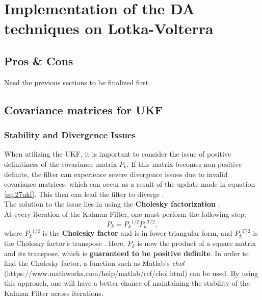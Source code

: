 \documentclass[review]{elsarticle}
\begin{document}

\section{Implementation of the DA techniques on Lotka-Volterra}\label{Lotka-Volterra}



\subsection{Pros \& Cons}
Need the previous sections to be finalized first.


\subsection{Covariance matrices for UKF}

    \subsubsection{Stability and Divergence Issues}
    When utilizing the UKF, it is important to consider the issue of positive definitiness of the covariance matrix $P_k$. If this matrix becomes non-positive definite, the filter can experience severe divergence issues due to invalid covariance matrices, which can occur as a result of the update made in equation \ref{eq:27ukf}. This then can lead the filter to diverge \cite{SimonHaykinText}. \\
    
    The solution to the issue lies in using the \textbf{Cholesky factorization} \cite{SimonHaykinText}.
    \\
    
    At every iteration of the Kalman Filter, one must perform the following step:
    \begin{equation}
    P_k = {P_k}^{1/2} {P_k}^{T/2},
    \end{equation}
    where ${P_k}^{1/2}$ is the \textbf{Cholesky factor} and is in lower-triangular form, and ${P_k}^{T/2}$ is the Cholesky factor's transpose \cite{SimonHaykinText}. Here, $P_k$ is now the product of a square matrix and its transpose, which is \textbf{guaranteed to be positive definite}. In order to find the Cholesky factor, a function such as Matlab's \emph{chol} (https://www.mathworks.com/help/matlab/ref/chol.html) can be used. By using this approach, one will have a better chance of maintaining the stability of the Kalman Filter across iterations. \\
\end{document}
